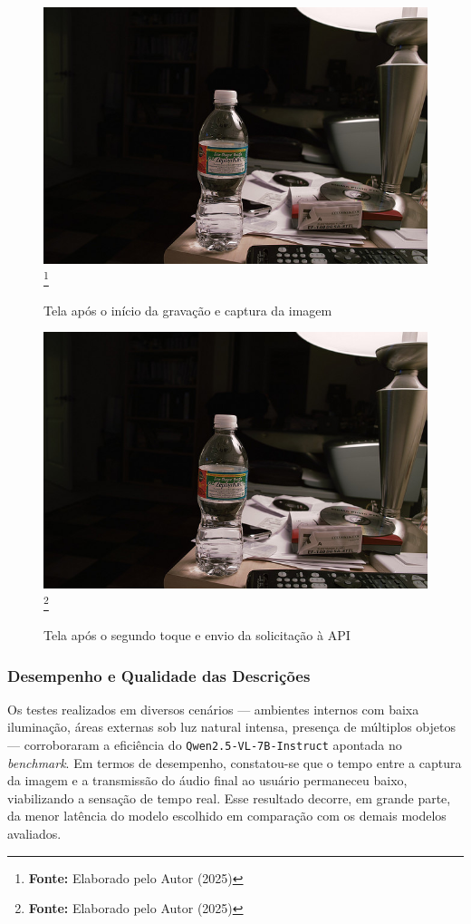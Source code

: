 \begin{figure}[!ht]
     \caption{Tela após o início da gravação e captura da imagem}
     \centering
     \includegraphics[width=0.7\linewidth]{imagens/garrafa.jpg}
     \label{fig:11}
     \footnote{\textbf{Fonte:} Elaborado pelo Autor (2025)}
\end{figure}

\begin{figure}[!ht]
     \caption{Tela após o segundo toque e envio da solicitação à API}
     \centering
     \includegraphics[width=0.7\linewidth]{imagens/garrafa.jpg}
     \label{fig:12}
     \footnote{\textbf{Fonte:} Elaborado pelo Autor (2025)}
\end{figure}

\subsubsection{Desempenho e Qualidade das Descrições}

Os testes realizados em diversos cenários — ambientes internos com baixa iluminação, áreas externas sob luz natural intensa, presença de múltiplos objetos — corroboraram a eficiência do \texttt{Qwen2.5-VL-7B-Instruct} apontada no \textit{benchmark}. Em termos de desempenho, constatou-se que o tempo entre a captura da imagem e a transmissão do áudio final ao usuário permaneceu baixo, viabilizando a sensação de tempo real. Esse resultado decorre, em grande parte, da menor latência do modelo escolhido em comparação com os demais modelos avaliados.

